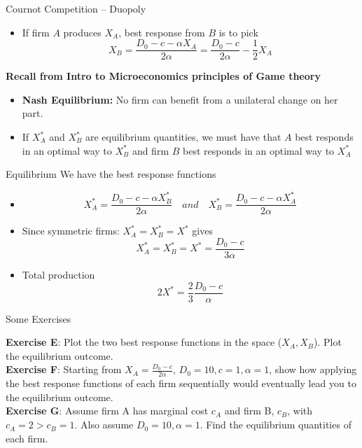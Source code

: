 \documentclass[handout]{beamer}
\newenvironment{iPar}[1]{\textbf{#1} \begin{itemize}}{\end{itemize}}
\newcommand{\mdp}{\medskip \pause}
\begin{document}
\begin{frame}{Cournot Competition -- Duopoly}
\begin{itemize}
\item If firm $A$ produces $X_A$, best response from $B$ is to pick
$$X_B =   \frac{D_0 -  c - \alpha X_A}{ 2 \alpha} = \frac{D_0 - c}{2\alpha} - \frac{1}{2}X_A $$
\end{itemize}\mdp

\begin{iPar}{Recall from Intro to Microeconomics principles of Game theory}
\item \textbf{Nash Equilibrium:} No firm can benefit from a unilateral change on her part. 

\item If $X^*_A$ and $X^*_B$ are equilibrium quantities, we must have that $A$ best responds in an optimal way to $X^*_B$ and firm $B$ best responds in an optimal way to $X^*_A$
\end{iPar}
\end{frame}


\begin{frame}{Equilibrium}
We have the best response functions
\begin{itemize}
\item  $$X^*_A =  \frac{D_0 - c - \alpha X_B^*}{ 2 \alpha} \quad and \quad  X^*_B = \frac{D_0 - c -  \alpha X_A^*}{2 \alpha} $$

\item Since symmetric firms: $X^*_A = X^*_B = X^*$ gives $$X^*_A = X^*_B = X^* = \frac{D_0 - c}{3\alpha}$$
\item Total production  $$2 X^* = \frac{2}{3} \frac{D_0 - c}{\alpha}$$
\end{itemize}

\end{frame}

\begin{frame}{Some Exercises}

\textbf{Exercise E}: Plot the two best response functions in the space ($X_A,X_B$). Plot the equilibrium outcome. \\
\textbf{Exercise F}: Starting from $X_A = \frac{D_0 - c}{2\alpha}$, $D_0=10,c=1,\alpha=1$, show how applying the best response functions of each firm sequentially would eventually lead you to the equilibrium outcome. \\ 
\textbf{Exercise G}: Assume firm A has marginal cost $c_A$ and firm B, $c_B$, with $c_A=2>c_B=1$. Also assume $D_0=10,\alpha=1$. Find the equilibrium quantities of each firm.  

\end{frame}
\end{document}
